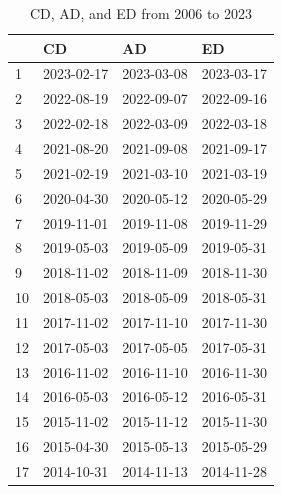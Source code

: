 \begin{table}[H]
\centering
\vspace{1em}
\caption{CD, AD, and ED from 2006 to 2023}
\label{CD-AD-ED-2006-2023}
\begin{tabular}{llll}
\hline
 & CD & AD & ED \\ 
\hline
1 & 2023-02-17 & 2023-03-08 & 2023-03-17 \\ 
2 & 2022-08-19 & 2022-09-07 & 2022-09-16 \\ 
3 & 2022-02-18 & 2022-03-09 & 2022-03-18 \\ 
4 & 2021-08-20 & 2021-09-08 & 2021-09-17 \\ 
5 & 2021-02-19 & 2021-03-10 & 2021-03-19 \\ 
6 & 2020-04-30 & 2020-05-12 & 2020-05-29 \\ 
7 & 2019-11-01 & 2019-11-08 & 2019-11-29 \\ 
8 & 2019-05-03 & 2019-05-09 & 2019-05-31 \\ 
9 & 2018-11-02 & 2018-11-09 & 2018-11-30 \\ 
10 & 2018-05-03 & 2018-05-09 & 2018-05-31 \\ 
11 & 2017-11-02 & 2017-11-10 & 2017-11-30 \\ 
12 & 2017-05-03 & 2017-05-05 & 2017-05-31 \\ 
13 & 2016-11-02 & 2016-11-10 & 2016-11-30 \\ 
14 & 2016-05-03 & 2016-05-12 & 2016-05-31 \\ 
15 & 2015-11-02 & 2015-11-12 & 2015-11-30 \\ 
16 & 2015-04-30 & 2015-05-13 & 2015-05-29 \\ 
17 & 2014-10-31 & 2014-11-13 & 2014-11-28 \\ 
\hline
\end{tabular}
\end{table}

